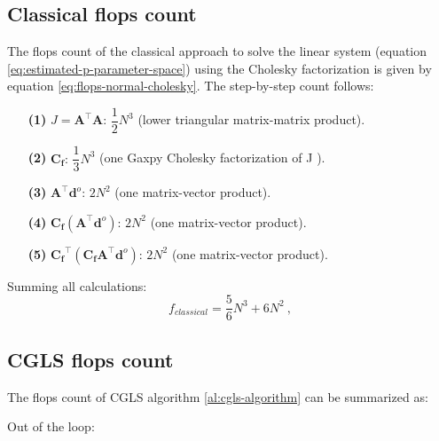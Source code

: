 
\subsection{Classical flops count}

The flops count of the classical approach to solve the linear system (equation \ref{eq:estimated-p-parameter-space}) using the Cholesky factorization is given by equation \ref{eq:flops-normal-cholesky}. The step-by-step count follows:
\begin{itemize}
\item[\textbf{(1)}] $J = \mathbf{A}^{\top}\mathbf{A}$: $\dfrac{1}{2} N^3$ (lower triangular matrix-matrix product).

\item[\textbf{(2)}] $\mathbf{C_f}: \, \dfrac{1}{3} N^3$ (one Gaxpy Cholesky factorization of J
\citep[p.~164]{golub-vanloan2013}).

\item[\textbf{(3)}] $\mathbf{A}^{\top} \mathbf{d}^{o}$: $2 N^2$ (one matrix-vector product).

\item[\textbf{(4)}] $\mathbf{C_f} (\mathbf{A}^{\top} \mathbf{d}^{o})$: $2 N^2$ (one matrix-vector product).

\item[\textbf{(5)}] $\mathbf{C_f}^{\top} (\mathbf{C_f} \mathbf{A}^{\top} \mathbf{d}^{o})$: $2 N^2$ (one matrix-vector product).
\end{itemize}
Summing all calculations: 
\begin{equation}
f_{classical} =  \dfrac{5}{6} N^{3} + 6 N^{2}\: ,
\label{eq:flops-normal-cholesky-append}
\end{equation}

\subsection{CGLS flops count}

The flops count of CGLS algorithm \ref{al:cgls-algorithm} can be summarized as:

Out of the loop:

